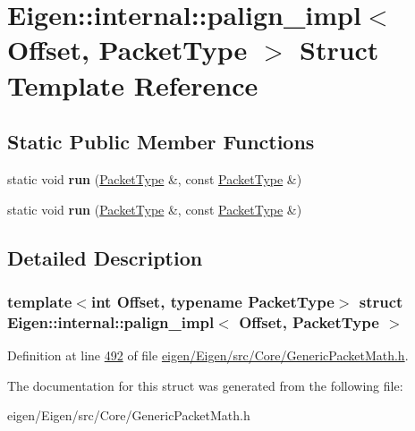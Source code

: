 \hypertarget{struct_eigen_1_1internal_1_1palign__impl}{}\section{Eigen\+:\+:internal\+:\+:palign\+\_\+impl$<$ Offset, Packet\+Type $>$ Struct Template Reference}
\label{struct_eigen_1_1internal_1_1palign__impl}
\subsection*{Static Public Member Functions}
\begin{DoxyCompactItemize}
\item 
\mbox{\label{struct_eigen_1_1internal_1_1palign__impl_a50d28052ed31511c0850d72acdc15d90}} 
static void {\bfseries run} (\hyperlink{struct_eigen_1_1_packet_type}{Packet\+Type} \&, const \hyperlink{struct_eigen_1_1_packet_type}{Packet\+Type} \&)
\item 
\mbox{\label{struct_eigen_1_1internal_1_1palign__impl_a50d28052ed31511c0850d72acdc15d90}} 
static void {\bfseries run} (\hyperlink{struct_eigen_1_1_packet_type}{Packet\+Type} \&, const \hyperlink{struct_eigen_1_1_packet_type}{Packet\+Type} \&)
\end{DoxyCompactItemize}


\subsection{Detailed Description}
\subsubsection*{template$<$int Offset, typename Packet\+Type$>$\newline
struct Eigen\+::internal\+::palign\+\_\+impl$<$ Offset, Packet\+Type $>$}



Definition at line \hyperlink{eigen_2_eigen_2src_2_core_2_generic_packet_math_8h_source_l00492}{492} of file \hyperlink{eigen_2_eigen_2src_2_core_2_generic_packet_math_8h_source}{eigen/\+Eigen/src/\+Core/\+Generic\+Packet\+Math.\+h}.



The documentation for this struct was generated from the following file\+:\begin{DoxyCompactItemize}
\item 
eigen/\+Eigen/src/\+Core/\+Generic\+Packet\+Math.\+h\end{DoxyCompactItemize}
